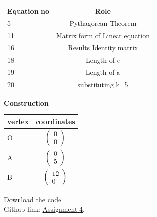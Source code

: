 \documentclass[10pt,a4paper]{report}
\begin{document}
\begin{multicols}{2}
\begin{center}
\setlength{\arrayrulewidth}{0.5mm}
\setlength{\tabcolsep}{5pt}
\renewcommand{\arraystretch}{3}
    \begin{tabular}{|l|c|}
    \hline 
    \textbf{Equation no} & \textbf{Role} \\ \hline
    5 &  Pythagorean Theorem \\ 
    11 & Matrix form of Linear equation  \\
    16 & Results Identity matrix  \\
    18 & Length of c\\
    19 & Length of a \\
    20 & substituting k=5\\
    \hline
      \end{tabular}
  \end{center} \vspace{2mm}
  
 \vspace{2mm} \textbf{Construction}
\begin{center}
\setlength{\arrayrulewidth}{0.5mm}
\setlength{\tabcolsep}{6pt}
\renewcommand{\arraystretch}{1.5}
    \begin{tabular}{|l|c|}
    \hline 
    \textbf{vertex} & \textbf{coordinates} \\ \hline
   O & $ \begin{pmatrix} 
0 \\
0
\end{pmatrix} $ \\ \hline
    A & $\begin{pmatrix}
0 \\
5
\end{pmatrix}$   \\\hline
    B & $\begin{pmatrix}
12 \\
0
\end{pmatrix} $\\
    \hline
      \end{tabular}
  \end{center}
  
\raggedright  Download the code \\
Github link: \href{https://github.com/chiragshah1244/FWC/blob/main/assignments/assignment-1/code/src/seq.cpp}{Assignment-4}.
  \end{multicols}
\end{document}

